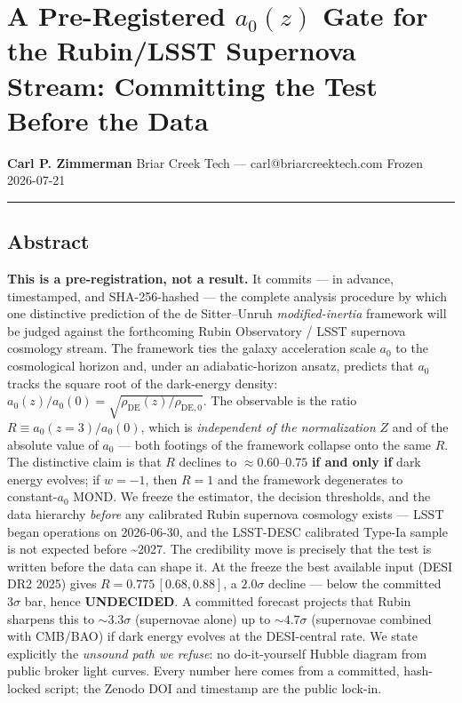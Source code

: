 \documentclass[
]{article}
\author{}
\date{}
\begin{document}
\section{\texorpdfstring{A Pre-Registered \(a_0(z)\) Gate for the
Rubin/LSST Supernova Stream: Committing the Test Before the
Data}{A Pre-Registered a\_0(z) Gate for the Rubin/LSST Supernova Stream: Committing the Test Before the Data}}\label{a-pre-registered-a_0z-gate-for-the-rubinlsst-supernova-stream-committing-the-test-before-the-data}

\textbf{Carl P. Zimmerman} Briar Creek Tech --- carl@briarcreektech.com
Frozen 2026-07-21

\begin{center}\rule{0.5\linewidth}{0.5pt}\end{center}

\subsection{Abstract}\label{abstract}

\textbf{This is a pre-registration, not a result.} It commits --- in
advance, timestamped, and SHA-256-hashed --- the complete analysis
procedure by which one distinctive prediction of the de Sitter--Unruh
\emph{modified-inertia} framework will be judged against the forthcoming
Rubin Observatory / LSST supernova cosmology stream. The framework ties
the galaxy acceleration scale \(a_0\) to the cosmological horizon and,
under an adiabatic-horizon ansatz, predicts that \(a_0\) tracks the
square root of the dark-energy density:
\(a_0(z)/a_0(0)=\sqrt{\rho_\mathrm{DE}(z)/\rho_\mathrm{DE,0}}\). The
observable is the ratio \(R\equiv a_0(z{=}3)/a_0(0)\), which is
\emph{independent of the normalization} \(Z\) and of the absolute value
of \(a_0\) --- both footings of the framework collapse onto the same
\(R\). The distinctive claim is that \(R\) declines to
\(\approx 0.60\)--\(0.75\) \textbf{if and only if} dark energy evolves;
if \(w=-1\), then \(R=1\) and the framework degenerates to
constant-\(a_0\) MOND. We freeze the estimator, the decision thresholds,
and the data hierarchy \emph{before} any calibrated Rubin supernova
cosmology exists --- LSST began operations on 2026-06-30, and the
LSST-DESC calibrated Type-Ia sample is not expected before
\textasciitilde2027. The credibility move is precisely that the test is
written before the data can shape it. At the freeze the best available
input (DESI DR2 2025) gives \(R=0.775\,[0.68,0.88]\), a \(2.0\sigma\)
decline --- below the committed \(3\sigma\) bar, hence
\textbf{UNDECIDED}. A committed forecast projects that Rubin sharpens
this to \(\sim 3.3\sigma\) (supernovae alone) up to \(\sim 4.7\sigma\)
(supernovae combined with CMB/BAO) if dark energy evolves at the
DESI-central rate. We state explicitly the \emph{unsound path we
refuse}: no do-it-yourself Hubble diagram from public broker light
curves. Every number here comes from a committed, hash-locked script;
the Zenodo DOI and timestamp are the public lock-in.
\end{document}

